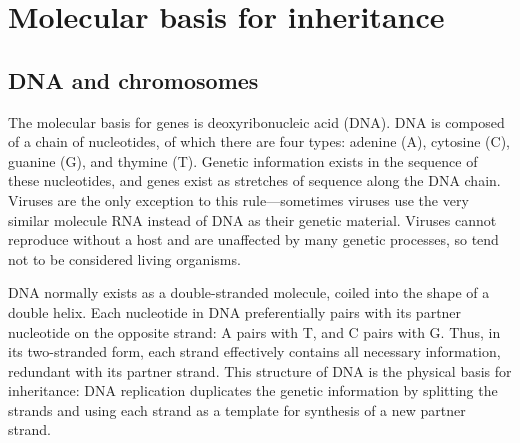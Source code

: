 \hypertarget{molecular-basis-for-inheritance}{%
\section{Molecular basis for inheritance}\label{molecular-basis-for-inheritance}}

\hypertarget{dna-and-chromosomes}{%
\subsection{DNA and chromosomes}\label{dna-and-chromosomes}}

The molecular basis for genes is deoxyribonucleic acid (DNA). DNA is composed of a chain of nucleotides, of which there are four types: adenine (A), cytosine (C), guanine (G), and thymine (T). Genetic information exists in the sequence of these nucleotides, and genes exist as stretches of sequence along the DNA chain. Viruses are the only exception to this rule---sometimes viruses use the very similar molecule RNA instead of DNA as their genetic material. Viruses cannot reproduce without a host and are unaffected by many genetic processes, so tend not to be considered living organisms.

DNA normally exists as a double-stranded molecule, coiled into the shape of a double helix. Each nucleotide in DNA preferentially pairs with its partner nucleotide on the opposite strand: A pairs with T, and C pairs with G. Thus, in its two-stranded form, each strand effectively contains all necessary information, redundant with its partner strand. This structure of DNA is the physical basis for inheritance: DNA replication duplicates the genetic information by splitting the strands and using each strand as a template for synthesis of a new partner strand.



